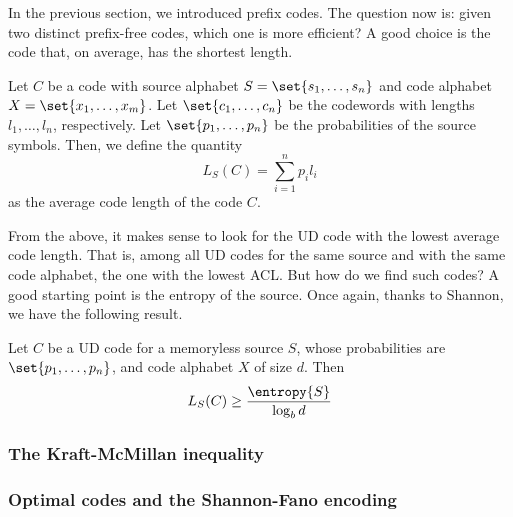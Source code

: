 \documentclass{subfiles}
\begin{document}
    In the previous section, we introduced prefix codes. 
        The question now is: given two distinct prefix-free codes, which one is more efficient?
        A good choice is the code that, on average, has the shortest length.

    \begin{definition*}
        Let \(C\) be a code with source alphabet \(S = \set{s_{1}, \ldots, s_{n}}\)
            and code alphabet \(X = \set{x_{1}, \ldots, x_{m}}\). 
            Let \(\set{c_{1}, \ldots, c_{n}}\) be the codewords with lengths \(l_{1}, \ldots, l_{n}\), respectively.
            Let \(\set{p_{1}, \ldots, p_{n}}\) be the probabilities of the source symbols. 
            Then, we define the quantity
            \[
                L_{S}(C) = \sum_{i = 1}^{n}{p_{i} l_{i}}
            \]
            as the average code length of the code \(C\).
    \end{definition*}

    From the above, it makes sense to look for the UD code with the lowest average code length.
        That is, among all UD codes for the same source and with the same code alphabet,
        the one with the lowest ACL. But how do we find such codes?
        A good starting point is the entropy of the source. 
        Once again, thanks to Shannon, we have the following result.

    \begin{theorem*}[Shannon]
        Let \(C\) be a UD code for a memoryless source \(S\), 
        whose probabilities are \(\set{p_{1}, \ldots, p_{n}}\),
        and code alphabet \(X\) of size \(d\). 
        Then 
        \[
            L_{S}(C) \ge \frac{\entropy{S}}{\log_{b}{d}}
        \]
    \end{theorem*}

    \subsubsection{The Kraft-McMillan inequality}
    

    \subsubsection{Optimal codes and the Shannon-Fano encoding}
    
\end{document}
